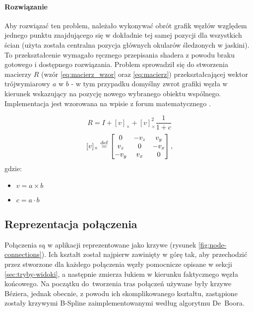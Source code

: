 
\paragraph{Rozwiązanie} Aby rozwiązać ten problem, należało wykonywać obrót grafik węzłów względem jednego punktu znajdującego się w dokładnie tej samej pozycji dla wszystkich ścian (użyta została centralna pozycja głównych okularów śledzonych w jaskini). To przekształcenie wymagało ręcznego przepisania shadera z powodu braku gotowego i dostępnego rozwiązania. Problem sprowadził się do stworzenia macierzy \(R\) (wzór \ref{eq:macierz_wzor} oraz \ref{eq:macierz}) przekształcającej wektor trójwymiarowy \(a\) w \(b\) - w tym przypadku domyślny zwrot grafiki węzła w kierunek wskazujący na pozycję nowego wybranego obiektu wspólnego. Implementacja jest wzorowana na wpisie z forum matematycznego \cite{BillboardShaderFormula}.

\newcommand\dotProd{a \cdot b}
\newcommand\crossProd[1]{(\overrightarrow{a \times b})_#1}
\begin{equation}
	\label{eq:macierz_wzor}
	R = I + [v]_{\times} + [v]_{\times}^2\frac{1}{1 + c}
\end{equation}
\begin{equation}
	\label{eq:macierz}
	[v]_{\times} \stackrel{\rm def}{=} 
	\begin{bmatrix}
		0 & -v_z & v_y\\
		v_z & 0 & -v_x\\
		-v_y & v_x & 0
	\end{bmatrix},
\end{equation}
gdzie:
\begin{itemize}
	\item \(v = a \times b\)
	\item \(c = a \cdot b\)
\end{itemize}

\subsection{Reprezentacja połączenia}
Połączenia są w aplikacji reprezentowane jako krzywe (rysunek \ref{fig:node-connections}). Ich kształt został najpierw zawinięty w górę tak, aby przechodzić przez stworzone dla każdego połączenia węzły pomocnicze opisane w sekcji \ref{sec:tryby-widoki}, a następnie zmierza łukiem w kierunku faktycznego węzła końcowego. Na początku do~tworzenia tras połączeń używane były krzywe Béziera, jednak obecnie, z powodu ich skomplikowanego kształtu, zastąpione zostały krzywymi B-Spline zaimplementowanymi według algorytmu De~Boora.

